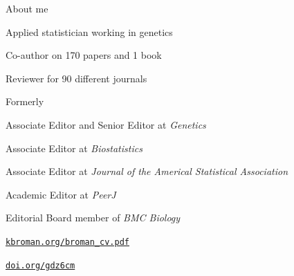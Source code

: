\documentclass[aspectratio=169,12pt,t]{beamer}
\begin{document}
\begin{frame}{About me}

  \vspace{-12pt}

  \bbi
\item Applied statistician working in genetics
\item Co-author on 170 papers and 1 book
\item Reviewer for 90 different journals
\item Formerly
  \bi
\item Associate Editor and Senior Editor at \emph{Genetics}
\item Associate Editor at \emph{Biostatistics}
\item Associate Editor at \emph{Journal of the Americal Statistical
Association}
\item Academic Editor at \emph{PeerJ}
\item Editorial Board member of \emph{BMC Biology}
  \ei
  \ei

  \vspace{30pt}
  \hfill
  \href{https://kbroman.org/broman_cv.pdf}{\tt \footnotesize \lolit kbroman.org/broman{\_}cv.pdf}

\end{frame}



\begin{frame}[c]{}

  \vspace{24pt}

  \centerline{}

  \vfill
  \hfill
  \href{https://doi.org/gdz6cm}{\tt \footnotesize \lolit doi.org/gdz6cm}

  \note{
  }
\end{frame}


\begin{frame}[c]{}

  \note{
  }
\end{frame}
\end{document}
